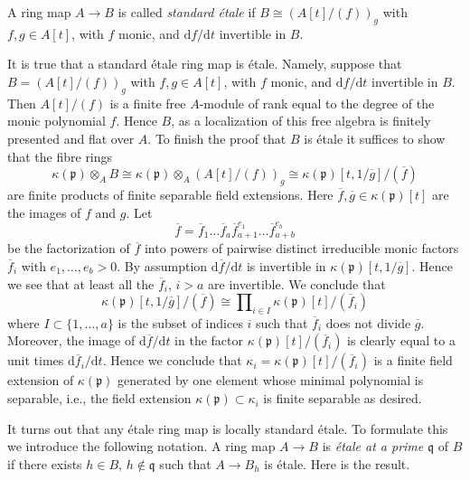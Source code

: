 \begin{definition}
\label{definition-standard-etale}
A ring map $A \to B$ is called {\it standard \'etale} if
$B \cong \left(A[t]/(f)\right)_g$ with $f, g \in A[t]$, with $f$ monic,
and $\text{d}f/\text{d}t$ invertible in $B$.
\end{definition}

\noindent
It is true that a standard \'etale ring map is \'etale. Namely, suppose
that $B = \left(A[t]/(f)\right)_g$ with $f, g \in A[t]$, with $f$ monic,
and $\text{d}f/\text{d}t$ invertible in $B$. Then $A[t]/(f)$ is a finite
free $A$-module of rank equal to the degree of the monic polynomial $f$.
Hence $B$, as a localization of this free algebra is finitely presented
and flat over $A$. To finish the proof that $B$ is \'etale it suffices
to show that the fibre rings
$$
\kappa(\mathfrak p) \otimes_A B
\cong
\kappa(\mathfrak p) \otimes_A (A[t]/(f))_g
\cong
\kappa(\mathfrak p)[t, 1/\overline{g}]/(\overline{f})
$$
are finite products of finite separable field extensions.
Here $\overline{f}, \overline{g} \in \kappa(\mathfrak p)[t]$ are
the images of $f$ and $g$. Let
$$
\overline{f} = \overline{f}_1 \ldots \overline{f}_a
\overline{f}_{a + 1}^{e_1} \ldots \overline{f}_{a + b}^{e_b}
$$
be the factorization of $\overline{f}$ into powers of pairwise distinct
irreducible monic factors $\overline{f}_i$ with $e_1, \ldots, e_b > 0$.
By assumption $\text{d}\overline{f}/\text{d}t$ is invertible in
$\kappa(\mathfrak p)[t, 1/\overline{g}]$. Hence we see that
at least all the $\overline{f}_i$, $i > a$ are invertible. We conclude
that
$$
\kappa(\mathfrak p)[t, 1/\overline{g}]/(\overline{f})
\cong
\prod\nolimits_{i \in I} \kappa(\mathfrak p)[t]/(\overline{f}_i)
$$
where $I \subset \{1, \ldots, a\}$ is the subset of indices $i$ such that
$\overline{f}_i$ does not divide $\overline{g}$. Moreover, the image of
$\text{d}\overline{f}/\text{d}t$ in the factor
$\kappa(\mathfrak p)[t]/(\overline{f}_i)$ is clearly equal to a
unit times $\text{d}\overline{f}_i/\text{d}t$. Hence we conclude that
$\kappa_i = \kappa(\mathfrak p)[t]/(\overline{f}_i)$ is a finite field
extension of $\kappa(\mathfrak p)$ generated by one element whose
minimal polynomial is separable, i.e., the field extension
$\kappa(\mathfrak p) \subset \kappa_i$ is finite separable as desired.

\medskip\noindent
It turns out that any \'etale ring map is locally standard \'etale.
To formulate this we introduce the following notation.
A ring map $A \to B$ is {\it \'etale at a prime $\mathfrak q$} of $B$ if there
exists $h \in B$, $h \not \in \mathfrak q$ such that $A \to B_h$ is \'etale.
Here is the result.

